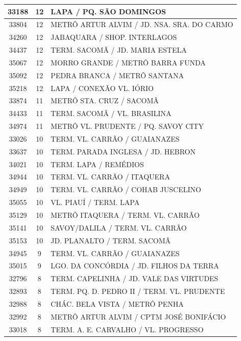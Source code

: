 \documentclass[
	12pt,				%
	oneside,			%
	a4paper,			%
	english,			%
	brazil				%
	]{abntex2ppgsi}
\begin{document}
\begin{apendicesenv}
\begin{longtable}{c|c|p{7cm}}
\hline
    33188 & 12    & LAPA / PQ. SÃO DOMINGOS \\
\hline
    33804 & 12    & METRÔ ARTUR ALVIM / JD. NSA. SRA. DO CARMO \\
\hline
    34260 & 12    & JABAQUARA / SHOP. INTERLAGOS \\
\hline
    34437 & 12    & TERM. SACOMÃ / JD. MARIA ESTELA \\
\hline
    35067 & 12    & MORRO GRANDE / METRÔ BARRA FUNDA \\
\hline
    35092 & 12    & PEDRA BRANCA / METRÔ SANTANA \\
\hline
    35218 & 12    & LAPA / CONEXÃO VL. IÓRIO \\
\hline
    33874 & 11    & METRÔ STA. CRUZ / SACOMÃ \\
\hline
    34433 & 11    & TERM. SACOMÃ / VL. BRASILINA \\
\hline
    34974 & 11    & METRÔ VL. PRUDENTE / PQ. SAVOY CITY \\
\hline
    33026 & 10    & TERM. VL. CARRÃO / GUAIANAZES \\
\hline
    33637 & 10    & TERM. PARADA INGLESA / JD. HEBRON \\
\hline
    34021 & 10    & TERM. LAPA / REMÉDIOS \\
\hline
    34944 & 10    & TERM. VL. CARRÃO / ITAQUERA \\
\hline
    34949 & 10    & TERM. VL. CARRÃO / COHAB JUSCELINO \\
\hline
    35055 & 10    & VL. PIAUÍ / TERM. LAPA \\
\hline
    35129 & 10    & METRÔ ITAQUERA / TERM. VL. CARRÃO \\
\hline
    35141 & 10    & SAVOY/DALILA / TERM. VL. CARRÃO \\
\hline
    35153 & 10    & JD. PLANALTO / TERM. SACOMÃ \\
\hline
    34945 & 9     & TERM. VL. CARRÃO / GUAIANAZES \\
\hline
    35015 & 9     & LGO. DA CONCÓRDIA / JD. FILHOS DA TERRA \\
\hline
    32796 & 8     & TERM. CAPELINHA / JD. VALE DAS VIRTUDES \\
\hline
    32893 & 8     & TERM. PQ. D. PEDRO II / TERM. VL. PRUDENTE \\
\hline
    32988 & 8     & CHÁC. BELA VISTA / METRÔ PENHA \\
\hline
    32992 & 8     & METRÔ ARTUR ALVIM / CPTM JOSÉ BONIFÁCIO \\
\hline
    33018 & 8     & TERM. A. E. CARVALHO / VL. PROGRESSO \\

\end{longtable}
\end{apendicesenv}
\end{document}
